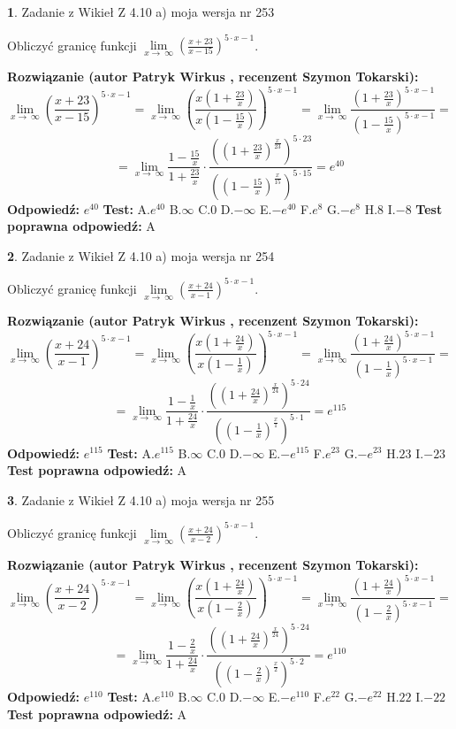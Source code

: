 \documentclass[12pt, a4paper]{article}
\theoremstyle{definition} %
\newtheorem{zad}{}
\newcommand{\zadStart}[1]{\begin{zad}#1\newline}
\newcommand{\zadStop}{\end{zad}}
\newcommand{\rozwStart}[2]{\noindent \textbf{Rozwiązanie (autor #1 , recenzent #2): }\newline}
\newcommand{\rozwStop}{\newline}
\newcommand{\odpStart}{\noindent \textbf{Odpowiedź:}\newline}
\newcommand{\odpStop}{\newline}
\newcommand{\testStart}{\noindent \textbf{Test:}\newline}
\newcommand{\testStop}{\newline}
\newcommand{\kluczStart}{\noindent \textbf{Test poprawna odpowiedź:}\newline}
\newcommand{\kluczStop}{\newline}
\begin{document}
\zadStart{Zadanie z Wikieł Z 4.10 a) moja wersja nr 253}

Obliczyć granicę funkcji  $\lim\limits_{x\to\ \infty}(\frac{x+23}{x-15})^{5\cdot x-1}$.
\zadStop
\rozwStart{Patryk Wirkus}{Szymon Tokarski}
$$\lim\limits_{x\to\ \infty}(\frac{x+23}{x-15})^{5\cdot x-1} = \lim\limits_{x\to\ \infty}(\frac{x(1+\frac{23}{x})}{x(1-\frac{15}{x})})^{5\cdot x-1}=\lim\limits_{x\to\ \infty}\frac{(1+\frac{23}{x})^{5\cdot x-1}}{(1-\frac{15}{x})^{5\cdot x-1}}=$$
$$=\lim\limits_{x\to\ \infty}\frac{1-\frac{15}{x}}{1+\frac{23}{x}}\cdot\frac{((1+\frac{23}{x})^{\frac{x}{23}})^{5\cdot23}}{((1-\frac{15}{x})^{\frac{x}{15}})^{5\cdot15}}=e^{40}$$
\rozwStop
\odpStart
$e^{40}$
\odpStop
\testStart
A.$e^{40}$ B.$\infty$ C.$0$ D.$-\infty$ E.$-e^{40}$
F.$e^{8}$ G.$-e^{8}$
H.$8$
I.$-8$
\testStop
\kluczStart
A
\kluczStop



\zadStart{Zadanie z Wikieł Z 4.10 a) moja wersja nr 254}

Obliczyć granicę funkcji  $\lim\limits_{x\to\ \infty}(\frac{x+24}{x-1})^{5\cdot x-1}$.
\zadStop
\rozwStart{Patryk Wirkus}{Szymon Tokarski}
$$\lim\limits_{x\to\ \infty}(\frac{x+24}{x-1})^{5\cdot x-1} = \lim\limits_{x\to\ \infty}(\frac{x(1+\frac{24}{x})}{x(1-\frac{1}{x})})^{5\cdot x-1}=\lim\limits_{x\to\ \infty}\frac{(1+\frac{24}{x})^{5\cdot x-1}}{(1-\frac{1}{x})^{5\cdot x-1}}=$$
$$=\lim\limits_{x\to\ \infty}\frac{1-\frac{1}{x}}{1+\frac{24}{x}}\cdot\frac{((1+\frac{24}{x})^{\frac{x}{24}})^{5\cdot24}}{((1-\frac{1}{x})^{\frac{x}{1}})^{5\cdot1}}=e^{115}$$
\rozwStop
\odpStart
$e^{115}$
\odpStop
\testStart
A.$e^{115}$ B.$\infty$ C.$0$ D.$-\infty$ E.$-e^{115}$
F.$e^{23}$ G.$-e^{23}$
H.$23$
I.$-23$
\testStop
\kluczStart
A
\kluczStop



\zadStart{Zadanie z Wikieł Z 4.10 a) moja wersja nr 255}

Obliczyć granicę funkcji  $\lim\limits_{x\to\ \infty}(\frac{x+24}{x-2})^{5\cdot x-1}$.
\zadStop
\rozwStart{Patryk Wirkus}{Szymon Tokarski}
$$\lim\limits_{x\to\ \infty}(\frac{x+24}{x-2})^{5\cdot x-1} = \lim\limits_{x\to\ \infty}(\frac{x(1+\frac{24}{x})}{x(1-\frac{2}{x})})^{5\cdot x-1}=\lim\limits_{x\to\ \infty}\frac{(1+\frac{24}{x})^{5\cdot x-1}}{(1-\frac{2}{x})^{5\cdot x-1}}=$$
$$=\lim\limits_{x\to\ \infty}\frac{1-\frac{2}{x}}{1+\frac{24}{x}}\cdot\frac{((1+\frac{24}{x})^{\frac{x}{24}})^{5\cdot24}}{((1-\frac{2}{x})^{\frac{x}{2}})^{5\cdot2}}=e^{110}$$
\rozwStop
\odpStart
$e^{110}$
\odpStop
\testStart
A.$e^{110}$ B.$\infty$ C.$0$ D.$-\infty$ E.$-e^{110}$
F.$e^{22}$ G.$-e^{22}$
H.$22$
I.$-22$
\testStop
\kluczStart
A
\kluczStop
\end{document}
